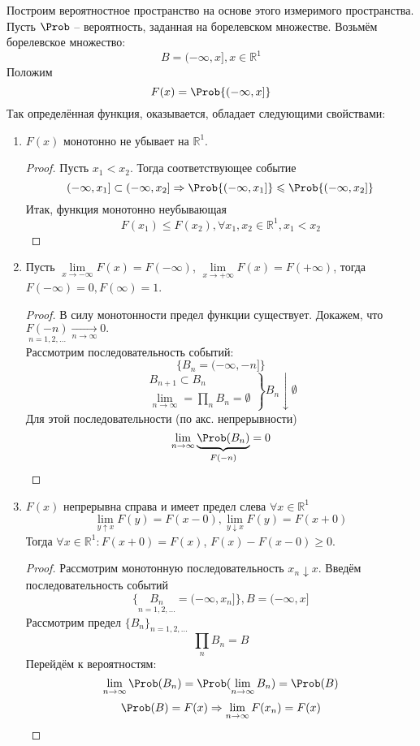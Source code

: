 Построим вероятностное пространство на основе этого измеримого пространства. Пусть $\Prob$ -- вероятность, заданная на борелевском множестве. Возьмём борелевское множество:
\[
  B = (- \infty, x], x \in \mathbb{R}^1
\]
Положим
\begin{equation}\label{3-1}
  F (x) = \Prob \{ (- \infty, x] \}
\end{equation}
Так определённая функция, оказывается, обладает следующими свойствами:
\begin{enumerate}
  \item $F(x)$ монотонно не убывает на $\mathbb{R}^1$.
  \begin{proof}
    Пусть $x_1 < x_2$. Тогда соответствующее событие
    \[
      (-\infty, x_1] \subset (-\infty, x_2] \Rightarrow \Prob \{ (-\infty, x_1] \} \leqslant \Prob \{ (-\infty, x_2] \}
    \]
    Итак, функция монотонно неубывающая
    \[
      F(x_1) \leqslant F(x_2), \forall x_1, x_2 \in \mathbb{R}^1, x_1 < x_2
    \]
  \end{proof}
  \item Пусть $\lim\limits_{x \to -\infty} F(x) = F(-\infty)$, $\lim\limits_{x \to +\infty} F(x) = F(+\infty)$, тогда $F(-\infty) = 0, F(\infty) = 1$.
  \begin{proof}
    В силу монотонности предел функции существует. Докажем, что $\underset{n = 1, 2, \ldots}{F(-n)} \underset{n \to \infty}{\rightarrow} 0.$ \\
    Рассмотрим последовательность событий:
    \[
      \{ B_n = (-\infty, -n] \}
    \]
    \[
      \left.
      \begin{split}
        B_{n+1} \subset B_n \\
        \lim\limits_{n \to \infty} = \prod\limits_n B_n = \emptyset
      \end{split}
      \right\}
      B_n \downarrow \emptyset
    \]
    Для этой последовательности (по акс. непрерывности)
    \[
      \lim\limits_{n \to \infty} \underbrace{\Prob(B_n)}_{F(-n)} = 0
    \]
  \end{proof}
  \item $F(x)$ непрерывна справа и имеет предел слева $\forall x \in \mathbb{R}^1$
  \[
    \lim\limits_{y \uparrow x} F(y) = F(x - 0), \lim\limits_{y \downarrow x} F(y) = F(x + 0)
  \]
  Тогда $\forall x \in \mathbb{R}^1: F(x+0) = F(x)$, $F(x) - F(x-0) \geqslant 0$.
  \begin{proof}
    Рассмотрим монотонную последовательность $x_n \downarrow x$. Введём последовательность событий
    \[
      \{ \underset{n = 1, 2, \ldots}{B_n} = (-\infty, x_n] \}, B = (-\infty, x]
    \]
    Рассмотрим предел $\{ B_n \}_{n = 1, 2, \ldots}$
    \[
      \prod\limits_n B_n = B
    \]
    Перейдём к вероятностям:
    \[
      \lim\limits_{n \to \infty} \Prob(B_n) = \Prob(\lim\limits_{n \to \infty} B_n) = \Prob(B)
    \]
    \[
      \Prob(B) = F(x) \Rightarrow \lim\limits_{n \to \infty} F(x_n) = F(x)
    \]
  \end{proof}
\end{enumerate}
